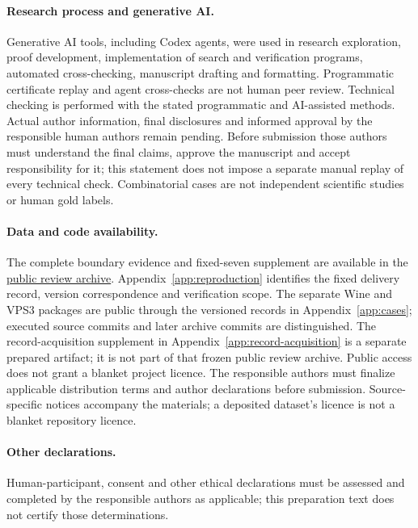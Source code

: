 \documentclass[pdflatex,sn-mathphys-num]{sn-jnl}
\theoremstyle{thmstyleone}
\theoremstyle{thmstylethree}
\theoremstyle{thmstyletwo}
\begin{document}
\paragraph*{Research process and generative AI.}
Generative AI tools, including Codex agents, were used in research exploration, proof development, implementation of search and verification programs, automated cross-checking, manuscript drafting and formatting. Programmatic certificate replay and agent cross-checks are not human peer review. Technical checking is performed with the stated programmatic and AI-assisted methods. Actual author information, final disclosures and informed approval by the responsible human authors remain pending. Before submission those authors must understand the final claims, approve the manuscript and accept responsibility for it; this statement does not impose a separate manual replay of every technical check. Combinatorial cases are not independent scientific studies or human gold labels.
\paragraph*{Data and code availability.}
The complete boundary evidence and fixed-seven supplement are available in the \href{https://github.com/SHiJiE1115/newproj/releases/tag/complete-six-review-20261011-v01}{public review archive}. Appendix~\ref{app:reproduction} identifies the fixed delivery record, version correspondence and verification scope. The separate Wine and VPS3 packages are public through the versioned records in Appendix~\ref{app:cases}; executed source commits and later archive commits are distinguished. The record-acquisition supplement in Appendix~\ref{app:record-acquisition} is a separate prepared artifact; it is not part of that frozen public review archive. Public access does not grant a blanket project licence. The responsible authors must finalize applicable distribution terms and author declarations before submission. Source-specific notices accompany the materials; a deposited dataset's licence is not a blanket repository licence.
\paragraph*{Other declarations.}
Human-participant, consent and other ethical declarations must be assessed and completed by the responsible authors as applicable; this preparation text does not certify those determinations.

\clearpage
\label{page:references-start}

\clearpage
\appendix
\end{document}
